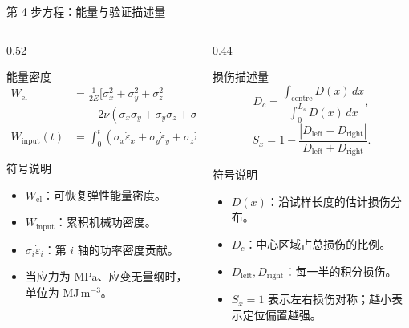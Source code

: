\documentclass[11pt,aspectratio=169]{beamer}
\begin{document}
\begin{frame}{第 4 步方程：能量与验证描述量}
  \scriptsize
  \begin{columns}[T,onlytextwidth]
    \begin{column}{0.52\textwidth}
      \begin{block}{能量密度}
        \[
          \begin{aligned}
          W_{\mathrm{el}} &=
          \frac{1}{2E}\Big[
          \sigma_x^2+\sigma_y^2+\sigma_z^2 \\
          &\quad -2\nu(\sigma_x\sigma_y+\sigma_y\sigma_z+\sigma_z\sigma_x)
          \Big],\\
          W_{\mathrm{input}}(t)&=
          \int_0^t
          \left(\sigma_x\dot{\varepsilon}_x+
          \sigma_y\dot{\varepsilon}_y+
          \sigma_z\dot{\varepsilon}_z\right)d\tau .
          \end{aligned}
        \]
      \end{block}
      \begin{block}{符号说明}
        \begin{itemize}
          \item $W_{\mathrm{el}}$：可恢复弹性能量密度。
          \item $W_{\mathrm{input}}$：累积机械功密度。
          \item $\sigma_i\dot{\varepsilon}_i$：第 $i$ 轴的功率密度贡献。
          \item 当应力为 MPa、应变无量纲时，单位为 MJ\,m$^{-3}$。
        \end{itemize}
      \end{block}
    \end{column}
    \begin{column}{0.44\textwidth}
      \begin{exampleblock}{损伤描述量}
        \[
          D_c=\frac{\int_{\mathrm{centre}}D(x)\,dx}
          {\int_0^{L_s}D(x)\,dx},
        \]
        \[
          S_x=1-
          \frac{|D_{\mathrm{left}}-D_{\mathrm{right}}|}
          {D_{\mathrm{left}}+D_{\mathrm{right}}}.
        \]
      \end{exampleblock}
      \begin{block}{符号说明}
        \begin{itemize}
          \item $D(x)$：沿试样长度的估计损伤分布。
          \item $D_c$：中心区域占总损伤的比例。
          \item $D_{\mathrm{left}},D_{\mathrm{right}}$：每一半的积分损伤。
          \item $S_x=1$ 表示左右损伤对称；越小表示定位偏置越强。
        \end{itemize}
      \end{block}
    \end{column}
  \end{columns}
\end{frame}
\end{document}
